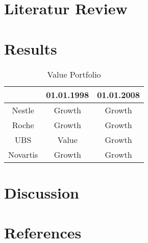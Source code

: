 \documentclass{article}
\begin{document}
\section{Literatur Review}
\blindtext
\newpage

\section{Results}

\begin{table} [!h] \centering 
  \begin{threeparttable}
    \caption{Value Portfolio}
     \begin{tabular}{ccc}
        \toprule

             & 01.01.1998 & 01.01.2008\\ \midrule
Nestle  & Growth & Growth     \\
Roche & Growth & Growth        \\ 
UBS & Value & Growth \\
Novartis & Growth & Growth
\\ \bottomrule

\end{tabular}
\end{threeparttable}
\end{table}

\blindtext
\newpage

\section{Discussion}
\blindtext
\newpage







\section{References}
\begingroup
\renewcommand{\section}[2]{}

\endgroup

\newpage
\end{document}
